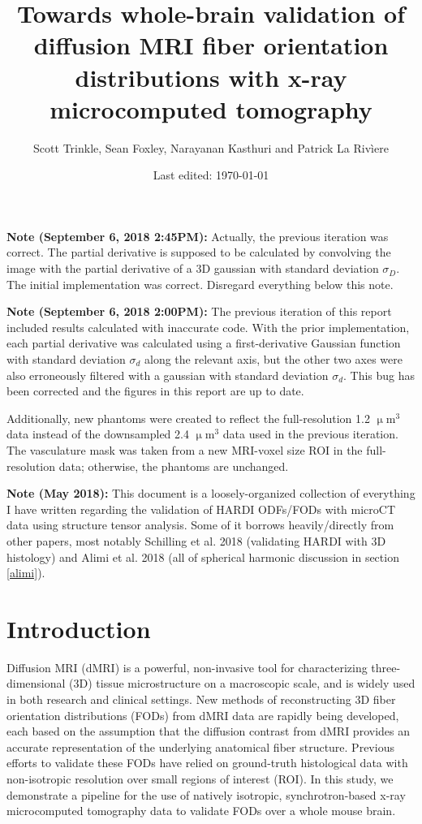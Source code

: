 \documentclass[11pt]{article}
\title{Towards whole-brain validation of diffusion MRI fiber orientation
  distributions with x-ray microcomputed tomography}
\author{Scott Trinkle, Sean
  Foxley, Narayanan Kasthuri and Patrick La Riv\`iere}
\date{Last edited: \today}
\begin{document}
\maketitle

\textbf{Note (September 6, 2018 2:45PM):} Actually, the previous iteration was
correct. The partial derivative is supposed to be calculated by convolving
the image with the partial derivative of a 3D gaussian with standard deviation
$\sigma_D$. The initial implementation was correct. Disregard everything
below this note. \newline


\textbf{Note (September 6, 2018 2:00PM):} The previous iteration of this report
included results calculated with inaccurate code. With the prior implementation,
each partial derivative was calculated using a first-derivative Gaussian
function with standard deviation $\sigma_d$ along the relevant axis, but the
other two axes were also erroneously filtered with a gaussian with standard
deviation $\sigma_d$. This bug has been corrected and the figures in this
report are up to date.

Additionally, new phantoms were created to reflect the full-resolution 1.2
$\upmu$m$^3$ data instead of the downsampled 2.4 $\upmu$m$^3$ data used in the
previous iteration. The vasculature mask was taken from a new MRI-voxel size
ROI in the full-resolution data; otherwise, the phantoms are unchanged. \newline


\textbf{Note (May 2018):} This document is a loosely-organized collection of everything I
have written regarding the validation of HARDI ODFs/FODs with microCT data using
structure tensor analysis. Some of it borrows heavily/directly from other
papers, most notably Schilling et al. 2018 \cite{Schilling2018} (validating
HARDI with 3D histology) and Alimi et al. 2018 \cite{Alimi2018} (all of
spherical harmonic discussion in section \ref{alimi}).


\section{Introduction}
Diffusion MRI (dMRI) is a powerful, non-invasive tool for characterizing
three-dimensional (3D) tissue microstructure on a macroscopic scale, and is
widely used in both research and clinical settings. New methods of
reconstructing 3D fiber orientation distributions (FODs) from dMRI data are
rapidly being developed, each based on the assumption that the diffusion
contrast from dMRI provides an accurate representation of the underlying
anatomical fiber structure. Previous efforts to validate these FODs have relied
on ground-truth histological data with non-isotropic resolution over small
regions of interest (ROI). In this study, we demonstrate a pipeline for the use
of natively isotropic, synchrotron-based x-ray microcomputed tomography data to
validate FODs over a whole mouse brain.
\end{document}
